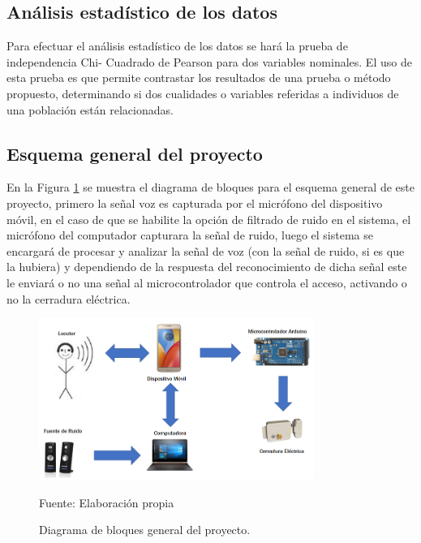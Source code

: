 \subsection{Análisis estadístico de los datos}
Para efectuar el análisis estadístico de los datos se hará la prueba de independencia Chi- Cuadrado de Pearson para dos variables nominales.
\vskip 0.5cm
El uso de esta prueba es que permite contrastar los resultados de una prueba o método propuesto, determinando si dos cualidades o variables referidas a individuos de una población están relacionadas. 

\subsection{Esquema general del proyecto}
En la Figura \ref{fig:figura2.58} se muestra el diagrama de bloques para el esquema general de este proyecto, primero la señal voz es capturada por el micrófono del dispositivo móvil, en el caso de que se habilite la opción de filtrado de ruido en el sistema, el micrófono del computador capturara la señal de ruido, luego el sistema se encargará de procesar y analizar la señal de voz (con la señal de ruido, si es que la hubiera) y dependiendo de la respuesta del reconocimiento de dicha señal este le enviará o no una señal al microcontrolador que controla el acceso, activando o no la cerradura eléctrica.
\vskip 0.5cm
\begin{figure}[H]
\begin{center}
\includegraphics[width=0.8\textwidth]{Imagenes/Cap2/image059}
\end{center}
\begin{center}
\vskip -0.5cm
\caption{\small{Diagrama de bloques general del proyecto.}}
\label{fig:figura2.58}
{\small{Fuente: Elaboración propia}}
\end{center}
\end{figure}